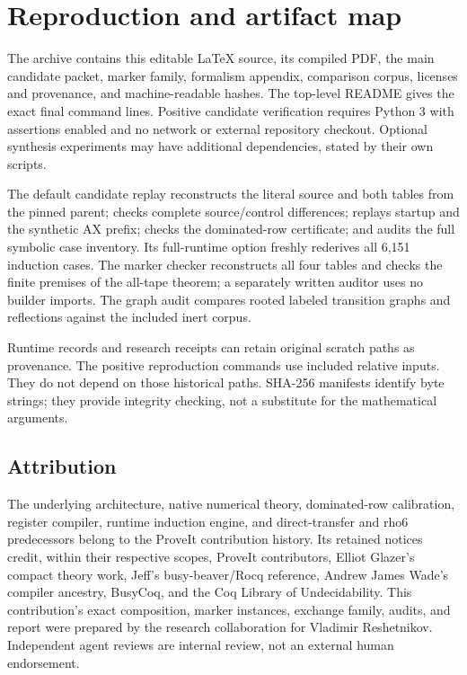 \documentclass[11pt,a4paper]{article}
\theoremstyle{definition}
\numberwithin{equation}{section}
\begin{document}
\section{Reproduction and artifact map}
\label{sec:reproduce}

The archive contains this editable \LaTeX{} source, its compiled PDF,
the main candidate packet, marker family, formalism appendix, comparison
corpus, licenses and provenance, and machine-readable hashes. The
top-level README gives the exact final command lines. Positive candidate
verification requires Python 3 with assertions enabled and no network or
external repository checkout. Optional synthesis experiments may have
additional dependencies, stated by their own scripts.

The default candidate replay reconstructs the literal source and both
tables from the pinned parent; checks complete source/control differences;
replays startup and the synthetic AX prefix; checks the dominated-row
certificate; and audits the full symbolic case inventory. Its full-runtime
option freshly rederives all 6,151 induction cases. The marker checker
reconstructs all four tables and checks the finite premises of the
all-tape theorem; a separately written auditor uses no builder imports.
The graph audit compares rooted labeled transition graphs and reflections
against the included inert corpus.

Runtime records and research receipts can retain original scratch paths
as provenance. The positive reproduction commands use included relative
inputs. They do not depend on those historical paths. SHA-256 manifests
identify byte strings; they provide integrity checking, not a substitute
for the mathematical arguments.

\subsection{Attribution}

The underlying architecture, native numerical theory, dominated-row
calibration, register compiler, runtime induction engine, and direct-transfer
and rho6 predecessors belong to the ProveIt contribution history. Its
retained notices credit, within their respective scopes, ProveIt
contributors, Elliot Glazer's compact theory work, Jeff's busy-beaver/Rocq
reference, Andrew James Wade's compiler ancestry, BusyCoq, and the Coq
Library of Undecidability. This contribution's exact composition, marker
instances, exchange family, audits, and report were prepared by the
research collaboration for Vladimir Reshetnikov. Independent agent
reviews are internal review, not an external human endorsement.
\end{document}
